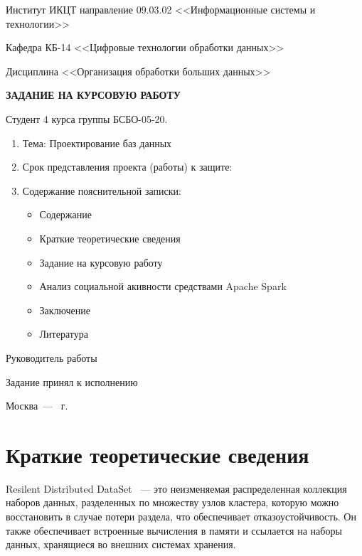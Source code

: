 \begin{titlepage}
	Институт ИКЦТ направление 09.03.02 <<Информационные системы и технологии>>
	
	Кафедра КБ-14 <<Цифровые технологии обработки данных>>
	
	Дисциплина <<Организация обработки больших данных>>
	
	\begin{center}
		\vspace*{1cm}
		{\fontsize{16pt}{16pt}\selectfont
			\textbf{ЗАДАНИЕ НА КУРСОВУЮ РАБОТУ}} \par
	\end{center}
	
	Студент 4 курса группы БСБО-05-20.
	
	\begin{enumerate}
		\item Тема: Проектирование баз данных
		\item Срок представления проекта (работы) к защите:
		\item Содержание пояснительной записки:
		\begin{itemize}
			\item Содержание
			\item Краткие теоретические сведения
			\item Задание на курсовую работу
			\item Анализ социальной акивности средствами Apache Spark
			\item Заключение
			\item Литература
		\end{itemize}
	\end{enumerate}
	
	Руководитель работы \underline{\hspace*{3cm}}
	
	Задание принял к исполнению \underline{\studentname}
	
	\begin{center}
		\vfill Москва~--- \the\year{}~г.
	\end{center}
\end{titlepage}
\addtocounter{page}{3}


\tableofcontents

\section{Краткие теоретические сведения}

Resilent Distributed DataSet~\cite{bib:rdd1, bib:rdd2, bib:rdd3} --- это неизменяемая распределенная коллекция наборов данных, разделенных по множеству узлов кластера, которую можно восстановить в случае потери раздела, что обеспечивает отказоустойчивость. Он также обеспечивает встроенные вычисления в памяти и ссылается на наборы данных, хранящиеся во внешних системах хранения.

